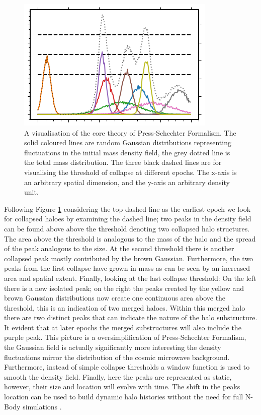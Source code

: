 \begin{figure}[h]
	\centering
	\includegraphics[width = \linewidth]{Figures/Chapter1/PS_Cartoon.png}
    \caption{A visualisation of the core theory of Press-Schechter Formalism. The solid coloured lines are random Gaussian distributions representing fluctuations in the initial mass density field, the grey dotted line is the total mass distribution. The three black dashed lines are for visualising the threshold of collapse at different epochs. The x-axis is an arbitrary spatial dimension, and the y-axis an arbitrary density unit.}
	\label{fig:PS_Cartoon}
\end{figure}

Following Figure \ref{fig:PS_Cartoon} considering the top dashed line as the earliest epoch we look for collapsed haloes by examining the dashed line; two peaks in the density field can be found above above the threshold denoting two collapsed halo structures. The area above the threshold is analogous to the mass of the halo and the spread of the peak analogous to the size. At the second threshold there is another collapsed peak mostly contributed by the brown Gaussian. Furthermore, the two peaks from the first collapse have grown in mass as can be seen by an increased area and spatial extent. Finally, looking at the last collapse threshold: On the left there is a new isolated peak; on the right the peaks created by the yellow and brown Gaussian distributions now create one continuous area above the threshold, this is an indication of two merged haloes. Within this merged halo there are two distinct peaks that can indicate the nature of the halo substructure. It evident that at later epochs the merged substructures will also include the purple peak. This picture is a oversimplification of Press-Schechter Formalism, the Gaussian field is actually significantly more interesting the density fluctuations mirror the distribution of the cosmic microwave background. Furthermore, instead of simple collapse thresholds a window function is used to smooth the density field. Finally, here the peaks are represented as static, however, their size and location will evolve with time. The shift in the peaks location can be used to build dynamic halo histories without the need for full N-Body simulations \cite{Voivodic2019ExcursionCatalogues}.

